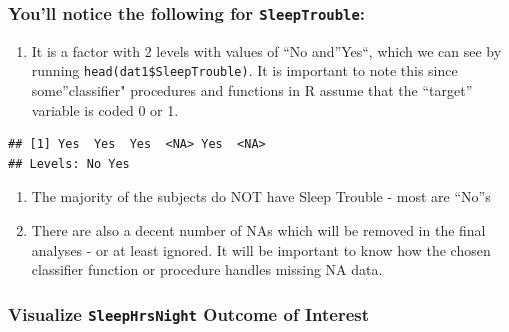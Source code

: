 \documentclass[]{article}
\newenvironment{Shaded}{\begin{snugshade}}{\end{snugshade}}
\newcommand{\KeywordTok}[1]{\textcolor[rgb]{0.13,0.29,0.53}{\textbf{{#1}}}}
\newcommand{\NormalTok}[1]{{#1}}
\providecommand{\tightlist}{%
  \setlength{\itemsep}{0pt}\setlength{\parskip}{0pt}}
\begin{document}
\subsubsection{\texorpdfstring{You'll notice the following for
\texttt{SleepTrouble}:}{You'll notice the following for SleepTrouble:}}\label{youll-notice-the-following-for-sleeptrouble}

\begin{enumerate}
\def\labelenumi{\arabic{enumi}.}
\tightlist
\item
  It is a factor with 2 levels with values of ``No and''Yes``, which we
  can see by running \texttt{head(dat1\$SleepTrouble)}. It is important
  to note this since some''classifier" procedures and functions in R
  assume that the ``target'' variable is coded 0 or 1.
\end{enumerate}

\begin{Shaded}
\end{Shaded}

\begin{verbatim}
## [1] Yes  Yes  Yes  <NA> Yes  <NA>
## Levels: No Yes
\end{verbatim}

\begin{enumerate}
\def\labelenumi{\arabic{enumi}.}
\setcounter{enumi}{1}
\tightlist
\item
  The majority of the subjects do NOT have Sleep Trouble - most are
  ``No''s
\item
  There are also a decent number of NAs which will be removed in the
  final analyses - or at least ignored. It will be important to know how
  the chosen classifier function or procedure handles missing NA data.
\end{enumerate}

\subsubsection{\texorpdfstring{Visualize \texttt{SleepHrsNight} Outcome
of
Interest}{Visualize SleepHrsNight Outcome of Interest}}\label{visualize-sleephrsnight-outcome-of-interest}
\end{document}
